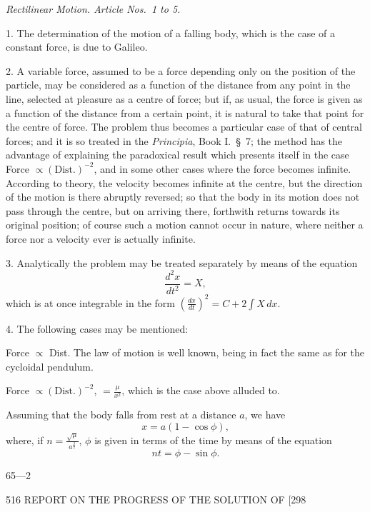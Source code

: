 \documentclass[11pt]{article}
\begin{document}
\medskip
\begin{center}\textit{Rectilinear Motion. Article Nos.\ 1 to 5.}\end{center}

1. The determination of the motion of a falling body, which is the case of a constant force, is due to Galileo.

2. A variable force, assumed to be a force depending only on the position of the particle, may be considered as a function of the distance from any point in the line, selected at pleasure as a centre of force; but if, as usual, the force is given as a function of the distance from a certain point, it is natural to take that point for the centre of force. The problem thus becomes a particular case of that of central forces; and it is so treated in the \emph{Principia}, Book I.\ \S\ 7; the method has the advantage of explaining the paradoxical result which presents itself in the case Force $\propto(\text{Dist.})^{-2}$, and in some other cases where the force becomes infinite. According to theory, the velocity becomes infinite at the centre, but the direction of the motion is there abruptly reversed; so that the body in its motion does not pass through the centre, but on arriving there, forthwith returns towards its original position; of course such a motion cannot occur in nature, where neither a force nor a velocity ever is actually infinite.

3. Analytically the problem may be treated separately by means of the equation
\[ \frac{d^{2}x}{dt^{2}}=X, \]
which is at once integrable in the form $\left(\frac{dx}{dt}\right)^{2}=C+2\int X\,dx.$

4. The following cases may be mentioned:

Force $\propto$ Dist. The law of motion is well known, being in fact the same as for the cycloidal pendulum.

Force $\propto(\text{Dist.})^{-2}$, $=\frac{\mu}{x^{2}}$, which is the case above alluded to.

Assuming that the body falls from rest at a distance $a$, we have
\[ x = a(1-\cos\phi), \]
where, if $n=\frac{\sqrt{\mu}}{a^{\frac{3}{2}}}$, $\phi$ is given in terms of the time by means of the equation
\[ nt = \phi-\sin\phi. \]
\begin{flushright}\small 65---2\end{flushright}

\newpage
\begin{center}
516 \hfill REPORT ON THE PROGRESS OF THE SOLUTION OF \hfill [298
\end{center}
\end{document}

